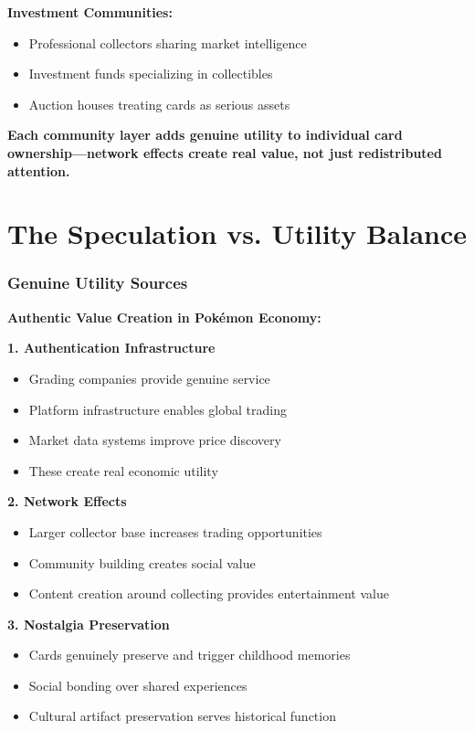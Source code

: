 \documentclass[11pt,oneside]{book}
\begin{document}
\textbf{Investment Communities:}
\begin{itemize}
\item Professional collectors sharing market intelligence
\item Investment funds specializing in collectibles
\item Auction houses treating cards as serious assets
\end{itemize}

\textbf{Each community layer adds genuine utility to individual card ownership—network effects create real value, not just redistributed attention.}

\section{The Speculation vs. Utility Balance}

\subsubsection{Genuine Utility Sources}

\textbf{Authentic Value Creation in Pokémon Economy:}

\textbf{1. Authentication Infrastructure}
\begin{itemize}
\item Grading companies provide genuine service
\item Platform infrastructure enables global trading
\item Market data systems improve price discovery
\item These create real economic utility
\end{itemize}

\textbf{2. Network Effects}
\begin{itemize}
\item Larger collector base increases trading opportunities
\item Community building creates social value
\item Content creation around collecting provides entertainment value
\end{itemize}

\textbf{3. Nostalgia Preservation}
\begin{itemize}
\item Cards genuinely preserve and trigger childhood memories
\item Social bonding over shared experiences
\item Cultural artifact preservation serves historical function
\end{itemize}
\end{document}
